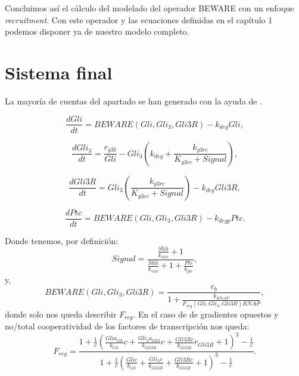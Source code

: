 Concluimos así el cálculo del modelado del operador BEWARE con un enfoque \textit{recruitment}. Con este operador y las ecuaciones definidas en el capítulo 1 podemos disponer ya de nuestro modelo completo.

\section{Sistema final}

La mayoría de cuentas del apartado se han generado con la ayuda de \cite{sympy}.

\begin{equation}
\frac{dGli}{dt} = BEWARE(Gli, Gli_3, Gli3R)-k_{deg}Gli,
\label{equ:12}
\end{equation}

\begin{equation}
\frac{dGli_3}{dt} = \frac{r_{g3b}}{Gli}-Gli_3\left(k_{deg}+\frac{k_{g3rc}}{K_{g3rc}+Signal}\right),
\label{eq:22}
\end{equation}

\begin{equation}
\frac{dGli3R}{dt}= Gli_3\left(\frac{k_{g3rc}}{K_{g3rc}+Signal}\right)-k_{deg}Gli3R,
\label{eq:32}
\end{equation}

\begin{equation}
\frac{dPtc}{dt} = BEWARE(Gli, Gli_3, Gli3R)-k_{degp}Ptc.
\label{eq:42}
\end{equation}


Donde tenemos, por definición:
 \begin{equation}
Signal=\frac{\frac{Shh}{k_{shh}} + 1}{\frac{Shh}{k_{shh}} + 1 + \frac{Ptc}{k_{ptc}}},
\label{signal} \end{equation}
y,
\begin{equation}
BEWARE(Gli, Gli_3, Gli3R)=\frac{c_{b}}{1 + \frac{k_{RNAP}}{F_{reg}(Gli, Gli_3, Gli3R) RNAP}},
\end{equation}
donde solo nos queda describir $F_{reg}$. En el caso de de gradientes opuestos y no/total cooperatividad de los factores de transcripción nos queda:
\begin{equation}
F_{reg}=\frac{1 + \frac{1}{c} \left(\frac{Gli a_{Gli}}{k_{Gli}} c + \frac{Gli_{3} a_{Gli3}}{k_{Gli3R}} c + \frac{Gli3R c}{k_{Gli3R}} r_{Gli3R} + 1\right)^{3} - \frac{1}{c}}{1 + \frac{1}{c} \left(\frac{Gli c}{k_{Gli}} + \frac{Gli_{3} c}{k_{Gli3R}} + \frac{Gli3R c}{k_{Gli3R}} + 1\right)^{3} - \frac{1}{c}}.
\end{equation}

